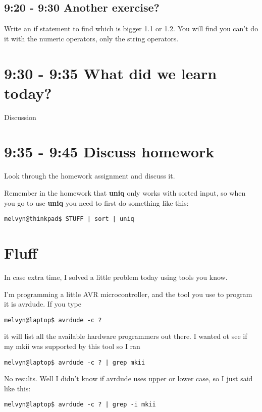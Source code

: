 \documentclass[10pt]{article}
\begin{document}
\subsection{9:20 - 9:30 Another exercise?}
Write an if statement to find which is bigger 1.1 or 1.2. You will find you
can't do it with the numeric operators, only the string operators.

\section{9:30 - 9:35 What did we learn today?}
Discussion


\section{9:35 - 9:45 Discuss homework}
Look through the homework assignment and discuss it.

Remember in the homework that \textbf{uniq} only works with sorted input, so
when you go to use \textbf{uniq} you need to first do something like this:

\begin{lstlisting}[style=term]
melvyn@thinkpad$ STUFF | sort | uniq
\end{lstlisting}

\section{Fluff}
In case extra time, I solved a little problem today using tools you know.

I'm programming a little AVR microcontroller, and the tool you use to program it
is avrdude. If you type 
\begin{lstlisting}[style=term]
melvyn@laptop$ avrdude -c ?
\end{lstlisting}

it will list all the available hardware programmers out there. I wanted ot see
if my mkii was supported by this tool so I ran

\begin{lstlisting}[style=term]
melvyn@laptop$ avrdude -c ? | grep mkii
\end{lstlisting}

No results. Well I didn't know if avrdude uses upper or lower case, so I just
said like this:

\begin{lstlisting}[style=term]
melvyn@laptop$ avrdude -c ? | grep -i mkii
\end{lstlisting}
\end{document}

